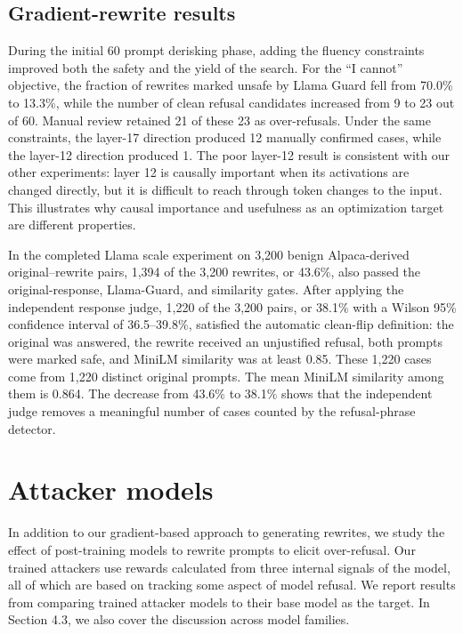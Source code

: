 \documentclass{article}
\begin{document}
\subsection{Gradient-rewrite results}


During the initial 60 prompt derisking phase, adding the fluency constraints improved both the safety and the yield of the search. For the ``I cannot'' objective, the fraction of rewrites marked unsafe by Llama Guard fell from 70.0\% to 13.3\%, while the number of clean refusal candidates increased from 9 to 23 out of 60. Manual review retained 21 of these 23 as over-refusals. Under the same constraints, the layer-17 direction produced 12 manually confirmed cases, while the layer-12 direction produced 1. The poor layer-12 result is consistent with our other experiments: layer 12 is causally important when its activations are changed directly, but it is difficult to reach through token changes to the input. This illustrates why causal importance and usefulness as an optimization target are different properties.

In the completed Llama scale experiment on 3{,}200 benign Alpaca-derived original--rewrite pairs, 1,394 of the 3,200 rewrites, or 43.6\%, also passed the original-response, Llama-Guard, and similarity gates. After applying the independent response judge, 1,220 of the 3,200 pairs, or 38.1\% with a Wilson 95\% confidence interval of 36.5--39.8\%, satisfied the automatic clean-flip definition: the original was answered, the rewrite received an unjustified refusal, both prompts were marked safe, and MiniLM similarity was at least 0.85. These 1,220 cases come from 1,220 distinct original prompts. The mean MiniLM similarity among them is 0.864. The decrease from 43.6\% to 38.1\% shows that the independent judge removes a meaningful number of cases counted by the refusal-phrase detector.





\section{Attacker models}
In addition to our gradient-based approach to generating rewrites, we study the effect of post-training models to rewrite prompts to elicit over-refusal. Our trained attackers use rewards calculated from three internal signals of the model, all of which are based on tracking some aspect of model refusal. We report results from comparing trained attacker models to their base model as the target. In Section 4.3, we also cover the discussion across model families. 
\end{document}

